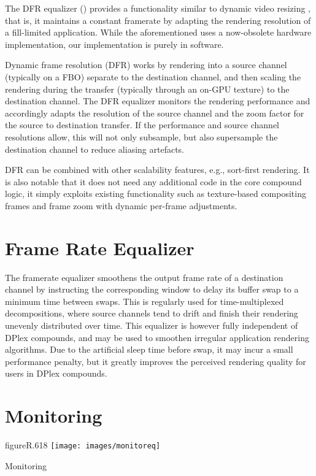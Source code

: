 The DFR equalizer () provides a functionality similar to dynamic
video resizing \cite{MBDM:97}, that is, it maintains a constant framerate by
adapting the rendering resolution of a fill-limited application. While the
aforementioned uses a now-obsolete hardware implementation, our implementation
is purely in software.

Dynamic frame resolution (DFR) works by rendering into a source channel
(typically on a FBO) separate to the destination channel, and then scaling the
rendering during the transfer (typically through an on-GPU texture) to the
destination channel. The DFR equalizer monitors the rendering performance and
accordingly adapts the resolution of the source channel and the zoom factor for
the source to destination transfer. If the performance and source channel
resolutions allow, this will not only subsample, but also supersample the
destination channel to reduce aliasing artefacts.

DFR can be combined with other scalability features, e.g., sort-first
rendering. It is also notable that it does not need any additional code in the
core compound logic, it simply exploits existing functionality such as
texture-based compositing frames and frame zoom with dynamic per-frame
adjustments.

\section{Frame Rate Equalizer}\label{sFramerateEq}

The framerate equalizer smoothens the output frame rate of a destination channel
by instructing the corresponding window to delay its buffer swap to a minimum
time between swaps. This is regularly used for time-multiplexed decompositions,
where source channels tend to drift and finish their rendering unevenly
distributed over time. This equalizer is however fully independent of DPlex
compounds, and may be used to smoothen irregular application rendering
algorithms. Due to the artificial sleep time before swap, it may incur a small
performance penalty, but it greatly improves the perceived rendering quality for
users in DPlex compounds.

\section{Monitoring}

\begin{wrapfloat}{figure}{R}{.618\textwidth}
  \texttt{[image: images/monitoreq]}
  \caption{\label{fmonitor}Monitoring}
\end{wrapfloat}

